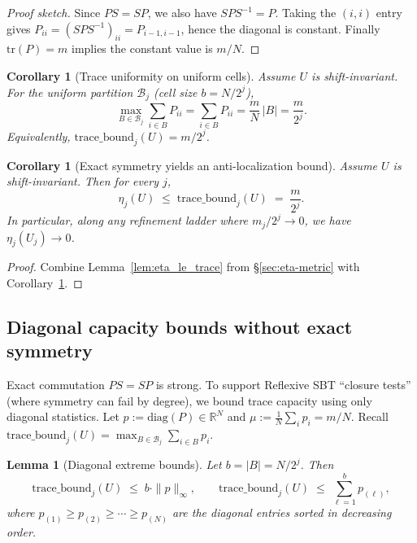 \documentclass[11pt]{article}
\theoremstyle{plain}
\newtheorem{lemma}[theorem]{Lemma}
\newtheorem{corollary}[theorem]{Corollary}
\theoremstyle{definition}
\theoremstyle{remark}
\newcommand{\R}{\mathbb{R}}
\begin{document}
\begin{proof}[Proof sketch]
Since \(PS=SP\), we also have \(SPS^{-1} = P\).
Taking the \((i,i)\) entry gives \(P_{ii} = (SPS^{-1})_{ii} = P_{i-1,i-1}\), hence the diagonal is constant.
Finally \(\mathrm{tr}(P)=m\) implies the constant value is \(m/N\).
\end{proof}

\begin{corollary}[Trace uniformity on uniform cells]\label{cor:trace_uniformity}
Assume \(U\) is shift-invariant.
For the uniform partition \(\mathcal{B}_j\) (cell size \(b=N/2^j\)),
\[
\max_{B\in\mathcal{B}_j}\sum_{i\in B} P_{ii}
=\sum_{i\in B} P_{ii}
= \frac{m}{N}\,|B|
=\frac{m}{2^j}.
\]
Equivalently, \(\mathrm{trace\_bound}_j(U)=m/2^j\).
\end{corollary}

\begin{corollary}[Exact symmetry yields an anti-localization bound]\label{cor:symmetry_implies_AL_bound}
Assume \(U\) is shift-invariant.
Then for every \(j\),
\[
\eta_j(U)\;\le\;\mathrm{trace\_bound}_j(U)\;=\;\frac{m}{2^j}.
\]
In particular, along any refinement ladder where \(m_j/2^j \to 0\), we have \(\eta_j(U_j)\to 0\).
\end{corollary}

\begin{proof}
Combine Lemma~\ref{lem:eta_le_trace} from \S\ref{sec:eta-metric} with Corollary~\ref{cor:trace_uniformity}.
\end{proof}

\subsection{Diagonal capacity bounds without exact symmetry}\label{subsec:diag_capacity_bounds}

Exact commutation \(PS=SP\) is strong.
To support Reflexive SBT ``closure tests'' (where symmetry can fail by degree), we bound trace capacity using only diagonal statistics.
Let \(p := \mathrm{diag}(P) \in \R^N\) and \(\mu := \frac{1}{N}\sum_i p_i = m/N\).
Recall \(\mathrm{trace\_bound}_j(U)=\max_{B\in\mathcal{B}_j}\sum_{i\in B} p_i\).

\begin{lemma}[Diagonal extreme bounds]\label{lem:diag_extreme_bounds}
Let \(b = |B| = N/2^j\).
Then
\[
\mathrm{trace\_bound}_j(U)
\;\le\;
b\cdot \|p\|_\infty,
\qquad
\mathrm{trace\_bound}_j(U)
\;\le\;
\sum_{\ell=1}^{b} p_{(\ell)},
\]
where \(p_{(1)} \ge p_{(2)} \ge \cdots \ge p_{(N)}\) are the diagonal entries sorted in decreasing order.
\end{lemma}
\end{document}
